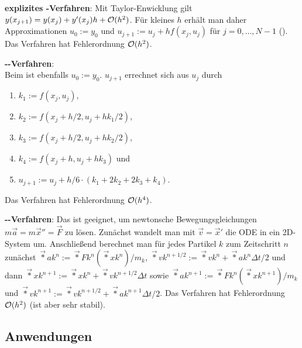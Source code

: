 \textbf{explizites -Verfahren}:
Mit Taylor-Enwicklung gilt $y(x_{j+1}) = y(x_j) + y'(x_j) h + \mathcal{O}(h^2)$.
Für kleines $h$ erhält man daher Approximationen
$u_0 := y_0$ und $u_{j+1} := u_j + h f(x_j, u_j)$ für $j = 0, \dotsc, N-1$
().
Das Verfahren hat Fehlerordnung $\mathcal{O}(h^2)$.

\linie

\textbf{--Verfahren}:\\
Beim  ist ebenfalls $u_0 := y_0$.
$u_{j+1}$ errechnet sich aus $u_j$ durch
\begin{enumerate}
    \item
    $k_1 := f(x_j, u_j)$,

    \item
    $k_2 := f(x_j + h/2, u_j + hk_1/2)$,

    \item
    $k_3 := f(x_j + h/2, u_j + hk_2/2)$,

    \item
    $k_4 := f(x_j + h, u_j + hk_3)$ und

    \item
    $u_{j+1} := u_j + h/6 \cdot (k_1 + 2k_2 + 2k_3 + k_4)$.
\end{enumerate}
Das Verfahren hat Fehlerordnung $\mathcal{O}(h^4)$.

\linie

\textbf{--Verfahren}:
Das  ist geeignet,
um newtonsche Bewegungsgleichungen $m\vec{a} = m\vec{x}'' = \vec{F}$ zu lösen.
Zunächst wandelt man mit $\vec{v} = \vec{x}'$ die ODE in ein 2D-System um.
Anschließend berechnet man für jedes Partikel $k$ zum Zeitschritt $n$ zunächst
$\vec*{a}{k}^n := \vec*{F}{k}^n(\vec*{x}{k}^n)/m_k$,
$\vec*{v}{k}^{n+1/2} := \vec*{v}{k}^n + \vec*{a}{k}^n \Delta t/2$ und dann
$\vec*{x}{k}^{n+1} := \vec*{x}{k}^n + \vec*{v}{k}^{n+1/2} \Delta t$ sowie
$\vec*{a}{k}^{n+1} := \vec*{F}{k}^n(\vec*{x}{k}^{n+1})/m_k$ und
$\vec*{v}{k}^{n+1} := \vec*{v}{k}^{n+1/2} + \vec*{a}{k}^{n+1} \Delta t/2$.
Das Verfahren hat Fehlerordnung $\mathcal{O}(h^2)$ (ist aber sehr stabil).

\pagebreak

\subsection{%
    Anwendungen%
}

